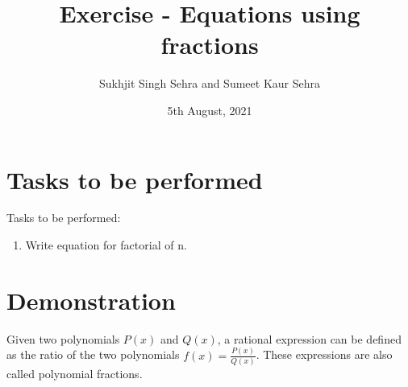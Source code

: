 \documentclass{article}
\title{Exercise  - Equations using fractions}
\author{Sukhjit Singh Sehra and Sumeet Kaur Sehra}
\date{5th August, 2021}
\begin{document}
	\maketitle
	\section*{Tasks to be performed}
	Tasks to be performed:
	\begin{enumerate}
		\item  Write equation for factorial of n.
	\end{enumerate}
\section*{Demonstration}

Given two polynomials $P(x)$ and $Q(x)$, a rational expression can be defined as the ratio of the two polynomials
$f(x)=\frac{P(x)}{Q(x)}$. These expressions are also called polynomial fractions.
\end{document}
